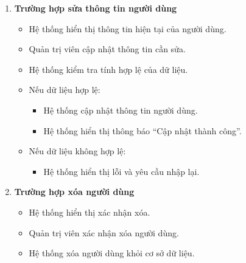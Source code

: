 \begin{enumerate}
\begin{itemize}
\begin{itemize}
            \item Hệ thống hiển thị thông báo ``Thêm người dùng thành công''.
        \end{itemize}
        
        \item Nếu dữ liệu không hợp lệ:
        \begin{itemize}
            \item Hệ thống hiển thị lỗi và yêu cầu nhập lại.
        \end{itemize}
    \end{itemize}

    \item \textbf{Trường hợp sửa thông tin người dùng}
    \begin{itemize}
        \item Hệ thống hiển thị thông tin hiện tại của người dùng.
        
        \item Quản trị viên cập nhật thông tin cần sửa.
        
        \item Hệ thống kiểm tra tính hợp lệ của dữ liệu.
        
        \item Nếu dữ liệu hợp lệ:
        \begin{itemize}
            \item Hệ thống cập nhật thông tin người dùng.
            
            \item Hệ thống hiển thị thông báo ``Cập nhật thành công''.
        \end{itemize}
        
        \item Nếu dữ liệu không hợp lệ:
        \begin{itemize}
            \item Hệ thống hiển thị lỗi và yêu cầu nhập lại.
        \end{itemize}
    \end{itemize}

    \item \textbf{Trường hợp xóa người dùng}
    \begin{itemize}
        \item Hệ thống hiển thị xác nhận xóa.
        
        \item Quản trị viên xác nhận xóa người dùng.
        
        \item Hệ thống xóa người dùng khỏi cơ sở dữ liệu.
        

\end{itemize}
\end{enumerate}
